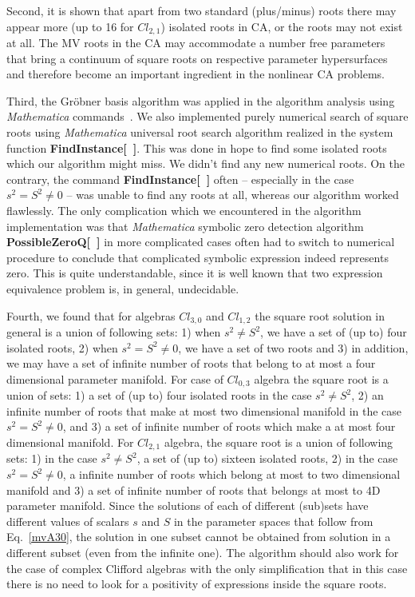 \documentclass{birkjour}
\newcommand{\cl}[2]{\ensuremath{\mathit{Cl}_{#1,#2}}}
\begin{document}
Second, it is shown that apart from two standard (plus/minus)
  roots there may appear more (up to 16 for \cl{2}{1}) isolated roots in CA, or
the roots may not exist at all. The MV roots in the CA may
accommodate a number free parameters that bring a continuum of
square roots on respective parameter hypersurfaces and therefore
become an important ingredient in the nonlinear CA problems.

Third, the Gr{\"o}bner basis algorithm was applied in the
algorithm analysis using \textit{Mathematica}
commands~\cite{AcusDargys2017}. We also implemented purely
numerical search of square roots using {\it Mathematica} universal
root search algorithm realized in the system function
\textbf{FindInstance[~]}. This was done in hope to find some
isolated roots which our algorithm might miss. We didn't find any
new numerical roots. On the contrary, the command
\textbf{FindInstance[~]} often -- especially in the case $s^2
=S^2\neq 0$ -- was unable to find any roots at all, whereas our
algorithm worked flawlessly. The only complication which we
encountered in the algorithm implementation was that {\it
Mathematica} symbolic zero detection algorithm
\textbf{PossibleZeroQ[~]} in more complicated cases often had to
switch to numerical procedure to conclude that complicated
symbolic expression indeed represents zero. This is quite
understandable, since it is well known that two expression
equivalence problem is, in general, undecidable.

Fourth, we found that for algebras $\cl{3}{0}$ and $\cl{1}{2}$ the
square root solution in general is a union of following sets: 1)
when $s^2\neq S^2$, we have a set of (up to) four isolated roots,
2) when $s^2 =S^2\neq 0$, we have a set of two roots  and 3) in
addition, we may have a set of infinite number of roots that
belong to at most a four dimensional parameter manifold. For case
of $\cl{0}{3}$ algebra the square root is a union of  sets: 1) a
set of (up to) four isolated roots in the case $s^2\neq S^2$, 2)
an infinite number of roots that make at most two dimensional
manifold in the case $s^2 =S^2\neq 0$, and 3) a set of infinite
number of roots which make a at most four dimensional manifold.
For $\cl{2}{1}$ algebra, the square root is a union of following
sets: 1) in  the case $s^2\neq S^2$, a set of (up to) sixteen
isolated roots, 2) in the case $s^2 =S^2\neq 0$, a infinite number
of roots which belong at most to two dimensional manifold and 3) a
set of infinite number of roots that belongs at most to 4D
parameter manifold. Since the solutions of each of different
(sub)sets have different values of scalars $s$ and $S$ in the
parameter spaces that follow from Eq.~\eqref{mvA30}, the solution
in one subset cannot be obtained from solution in a different
subset (even from the infinite one). The algorithm should also
work for the case of complex Clifford algebras with the only
simplification that in this case there is no need to look
for a positivity of expressions inside the square roots.
\end{document}
